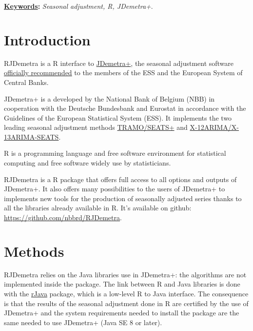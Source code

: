 \documentclass[12pt,a4paper]{article}
\title{
\vspace{-5ex}
\thetitle
\vspace{-2ex}
}
\author{
\theauthors
\vspace{-5ex}
}
\date{}
\def\thekeywords{
\textit{Seasonal adjustment, R, JDemetra+}.
}
\begin{document}
\cfoot{\thepage} %

\sectionfont{\large\textsc}

\maketitle

{\fontsize{10pt}{12.0pt}\selectfont \textbf{\uline{Keywords}:} \thekeywords\par}\par


\section{Introduction}\label{introduction}

RJDemetra is a R interface to
\href{https://github.com/jdemetra/jdemetra-app}{JDemetra+}, the seasonal
adjustment software
\href{https://ec.europa.eu/eurostat/cros/system/files/Jdemetra_\%20release.pdf}{officially
recommended} to the members of the ESS and the European System of
Central Banks.

JDemetra+ is a developed by the National Bank of Belgium (NBB) in
cooperation with the Deutsche Bundesbank and Eurostat in accordance with
the Guidelines of the European Statistical System (ESS). It implements
the two leading seasonal adjustment methods
\href{http://www.bde.es/bde/en/secciones/servicios/Profesionales/Programas_estadi/Programas_estad_d9fa7f3710fd821.html}{TRAMO/SEATS+}
and
\href{https://www.census.gov/srd/www/x13as/}{X-12ARIMA/X-13ARIMA-SEATS}.

R is a programming language and free software environment for
statistical computing and free software widely use by statisticians.

RJDemetra is a R package that offers full access to all options and
outputs of JDemetra+. It also offers many possibilities to the users of
JDemetra+ to implements new tools for the production of seasonally
adjusted series thanks to all the libraries already available in R. It's
available on github: \url{https://github.com/nbbrd/RJDemetra}.

\section{Methods}\label{methods}

RJDemetra relies on the Java libraries use in JDemetra+: the algorithms
are not implemented inside the package. The link between R and Java
libraries is done with the
\href{https://CRAN.R-project.org/package=rJava}{rJava} package, which is
a low-level R to Java interface. The consequence is that the results of
the seasonal adjustment done in R are certified by the use of JDemetra+
and the system requirements needed to install the package are the same
needed to use JDemetra+ (Java SE 8 or later).
\end{document}
